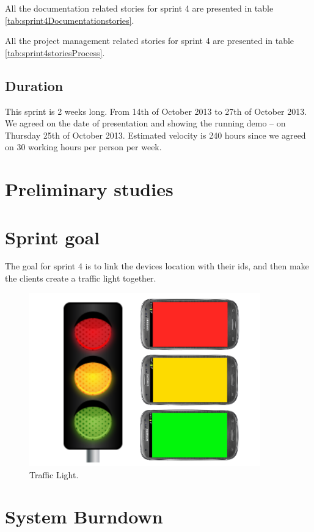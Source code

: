 All the documentation related stories for sprint 4 are presented in table \ref{tab:sprint4Documentationstories}.

All the project management related stories for sprint 4 are presented in table \ref{tab:sprint4storiesProcess}.



\subsection{Duration}
This sprint is 2 weeks long. From 14th of October 2013 to 27th of October 2013. We agreed
on the date of presentation and showing the running demo – on Thursday 25th of October 2013.
Estimated velocity is 240 hours since we agreed on 30 working hours per person per week.

\section{Preliminary studies}
\section{Sprint goal}

The goal for sprint 4 is to link the devices location with their ids, and then make the clients create a traffic light together. 
\begin{figure}[H]
	\centering
		\includegraphics[width=10cm]{sprint4/trafficlight.png}
	\caption{Traffic Light.}
	\label{fig:trafficlight }
\end{figure}

\section{System Burndown}

